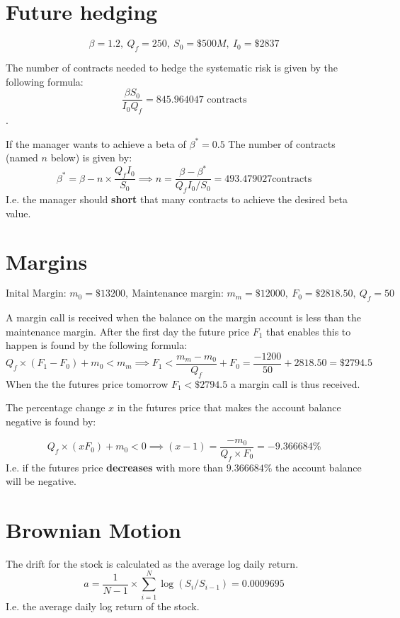 \documentclass{article}
\begin{document}
\thispagestyle{fancy}

\section{Future hedging}

$$\beta = 1.2, \ Q_f = 250, \ S_0 = \$500M, \ I_0 = \$2837$$

The number of contracts needed to hedge the systematic risk is given by the following formula:
$$\frac{\beta S_0}{I_0 Q_f} = 845.964047 \text{ contracts}$$. 

If the manager wants to achieve a beta of $\beta^* = 0.5$ The number of contracts (named $n$ below) is given by:
$$\beta^* = \beta - n \times \frac{Q_f I_0}{S_0} \implies n = \frac{\beta - \beta^*}{Q_f I_0 / S_0} = 493.479027 \text{contracts}$$
I.e. the manager should \textbf{short} that many contracts to achieve the desired beta value.

\section{Margins}

$$\text{Inital Margin: } m_0=\$13200, \ \text{Maintenance margin: }m_m = \$12000, \ F_0 = \$2818.50, \ Q_f = 50$$

A margin call is received when the balance on the margin account is less than the maintenance margin. After the first day the future price $F_1$ that enables this to happen is found by the following formula: 
$$Q_f \times (F_1 - F_0) + m_0 < m_m \implies F_1 < \frac{m_m - m_0}{Q_f} + F_0 = \frac{-1200}{50} + 2818.50 = \$2794.5$$
When the the futures price tomorrow $F_1 < \$2794.5$ a margin call is thus received.

The percentage change $x$ in the futures price that makes the account balance negative is found by: 

$$Q_f \times (xF_0) + m_0 < 0 \implies (x-1) = \frac{-m_0}{Q_f \times F_0} = -9.366684\%$$
I.e. if the futures price \textbf{decreases} with more than $9.366684\%$ the account balance will be negative.


\section{Brownian Motion}

The drift for the stock is calculated as the average log daily return.
$$a = \frac{1}{N-1} \times \sum_{i=1}^N \log(S_i / S_{i-1}) = 0.0009695$$
I.e. the average daily log return of the stock.
\end{document}
